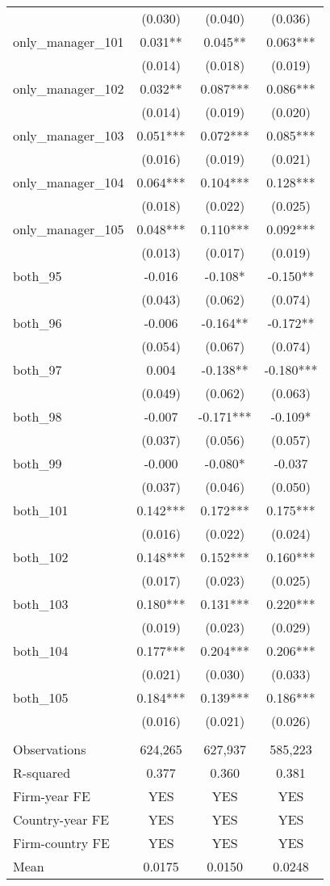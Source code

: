 \begin{tabular}{lccc}
 & (0.030) & (0.040) & (0.036) \\
only\_manager\_101 & 0.031** & 0.045** & 0.063*** \\
 & (0.014) & (0.018) & (0.019) \\
only\_manager\_102 & 0.032** & 0.087*** & 0.086*** \\
 & (0.014) & (0.019) & (0.020) \\
only\_manager\_103 & 0.051*** & 0.072*** & 0.085*** \\
 & (0.016) & (0.019) & (0.021) \\
only\_manager\_104 & 0.064*** & 0.104*** & 0.128*** \\
 & (0.018) & (0.022) & (0.025) \\
only\_manager\_105 & 0.048*** & 0.110*** & 0.092*** \\
 & (0.013) & (0.017) & (0.019) \\
both\_95 & -0.016 & -0.108* & -0.150** \\
 & (0.043) & (0.062) & (0.074) \\
both\_96 & -0.006 & -0.164** & -0.172** \\
 & (0.054) & (0.067) & (0.074) \\
both\_97 & 0.004 & -0.138** & -0.180*** \\
 & (0.049) & (0.062) & (0.063) \\
both\_98 & -0.007 & -0.171*** & -0.109* \\
 & (0.037) & (0.056) & (0.057) \\
both\_99 & -0.000 & -0.080* & -0.037 \\
 & (0.037) & (0.046) & (0.050) \\
both\_101 & 0.142*** & 0.172*** & 0.175*** \\
 & (0.016) & (0.022) & (0.024) \\
both\_102 & 0.148*** & 0.152*** & 0.160*** \\
 & (0.017) & (0.023) & (0.025) \\
both\_103 & 0.180*** & 0.131*** & 0.220*** \\
 & (0.019) & (0.023) & (0.029) \\
both\_104 & 0.177*** & 0.204*** & 0.206*** \\
 & (0.021) & (0.030) & (0.033) \\
both\_105 & 0.184*** & 0.139*** & 0.186*** \\
 & (0.016) & (0.021) & (0.026) \\
 &  &  &  \\
Observations & 624,265 & 627,937 & 585,223 \\
R-squared & 0.377 & 0.360 & 0.381 \\
Firm-year FE & YES & YES & YES \\
Country-year FE & YES & YES & YES \\
Firm-country FE & YES & YES & YES \\
 Mean & 0.0175 & 0.0150 & 0.0248 \\ \hline
\end{tabular}
